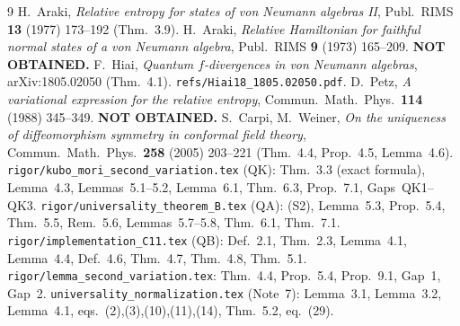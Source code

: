 \documentclass[11pt]{article}
\begin{document}
\begin{thebibliography}{9}
 H.~Araki, \emph{Relative entropy for states of von Neumann algebras II}, Publ.\ RIMS
 \textbf{13} (1977) 173--192 (Thm.~3.9).
 H.~Araki, \emph{Relative Hamiltonian for faithful normal states of a von Neumann
 algebra}, Publ.\ RIMS \textbf{9} (1973) 165--209.  \textbf{NOT OBTAINED.}
 F.~Hiai, \emph{Quantum $f$-divergences in von Neumann algebras}, arXiv:1805.02050
 (Thm.~4.1). \texttt{refs/Hiai18\_1805.02050.pdf}.
 D.~Petz, \emph{A variational expression for the relative entropy}, Commun.\ Math.\ Phys.\
 \textbf{114} (1988) 345--349.  \textbf{NOT OBTAINED.}
 S.~Carpi, M.~Weiner, \emph{On the uniqueness of diffeomorphism symmetry in conformal field
 theory}, Commun.\ Math.\ Phys.\ \textbf{258} (2005) 203--221 (Thm.~4.4, Prop.~4.5, Lemma~4.6).
\bibitem{qk} \texttt{rigor/kubo\_mori\_second\_variation.tex} (QK): Thm.~3.3 (exact formula), Lemma~4.3,
 Lemmas~5.1--5.2, Lemma~6.1, Thm.~6.3, Prop.~7.1, Gaps~QK1--QK3.
\bibitem{qa} \texttt{rigor/universality\_theorem\_B.tex} (QA): (S2), Lemma~5.3, Prop.~5.4, Thm.~5.5,
 Rem.~5.6, Lemmas~5.7--5.8, Thm.~6.1, Thm.~7.1.
 \texttt{rigor/implementation\_C11.tex} (QB): Def.~2.1, Thm.~2.3, Lemma~4.1, Lemma~4.4,
 Def.~4.6, Thm.~4.7, Thm.~4.8, Thm.~5.1.
 \texttt{rigor/lemma\_second\_variation.tex}: Thm.~4.4, Prop.~5.4, Prop.~9.1, Gap~1, Gap~2.
\bibitem{n7} \texttt{universality\_normalization.tex} (Note~7): Lemma~3.1, Lemma~3.2, Lemma~4.1,
 eqs.~(2),(3),(10),(11),(14), Thm.~5.2, eq.~(29).
\end{thebibliography}
\end{document}
